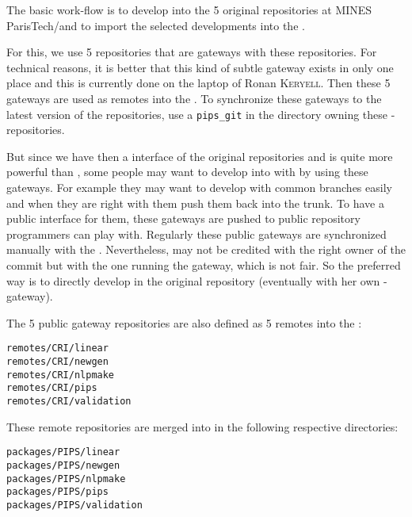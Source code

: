 \documentclass[a4paper]{article}
\begin{document}
The basic \Apips work-flow is to develop into the 5 original \Apips{}
\Asvn repositories at MINES ParisTech/\Acri and to import the selected
developments into the \Apfa{} \Agit.

For this, we use 5 \Agit repositories that are gateways with these \Asvn
repositories. For technical reasons, it is better that this kind of subtle
gateway exists in only one place and this is currently done on the laptop
of Ronan \textsc{Keryell}. Then these 5 gateways are used as remotes into
the \Apfa{} \Agit. To synchronize these gateways to the latest version of
the \Apips{} \Asvn repositories, use a \verb|pips_git| in the directory
owning these \Agit-\Asvn repositories.

But since we have then a \Agit interface of the original \Apips{} \Asvn
repositories and \Agit is quite more powerful than \Asvn, some people may
want to develop into \Apips with \Agit by using these gateways. For
example they may want to develop with common branches easily and when they
are right with them push them back into the \Apips{} \Asvn trunk. To have
a public interface for them, these \Agit gateways are pushed to public
\Agit repository programmers can play with. Regularly these public
gateways are synchronized manually with the \Apips{} \Asvn. Nevertheless,
\Asvn may not be credited with the right owner of the commit but with the
one running the gateway, which is not fair. So the preferred way is to
directly develop in the original \Apips \Asvn repository (eventually with
her own \Agit-\Asvn gateway).

The 5 public gateway \Agit repositories are also defined as 5 remotes into
the \Apfa{} \Agit:
\begin{description}
\item[\texttt{remotes/CRI/linear}]
\item[\texttt{remotes/CRI/newgen}]
\item[\texttt{remotes/CRI/nlpmake}]
\item[\texttt{remotes/CRI/pips}]
\item[\texttt{remotes/CRI/validation}]
\end{description}

These remote repositories are merged into \Apfa in the following
respective directories:
\begin{description}
\item[\texttt{packages/PIPS/linear}]
\item[\texttt{packages/PIPS/newgen}]
\item[\texttt{packages/PIPS/nlpmake}]
\item[\texttt{packages/PIPS/pips}]
\item[\texttt{packages/PIPS/validation}]
\end{description}
\end{document}
